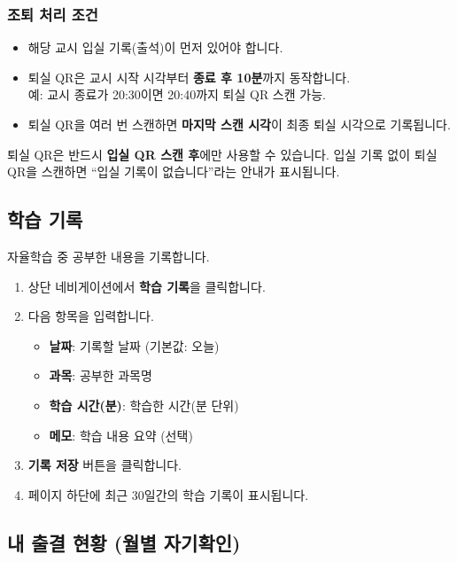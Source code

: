 \documentclass[a4paper,12pt]{article}
\newcommand{\menu}[1]{\textcolor{primary}{\textbf{#1}}}
\begin{document}
\subsubsection{조퇴 처리 조건}

\begin{itemize}[leftmargin=1.5em]
    \item 해당 교시 입실 기록(출석)이 먼저 있어야 합니다.
    \item 퇴실 QR은 교시 시작 시각부터 \textbf{종료 후 10분}까지 동작합니다.\\
          예: 교시 종료가 20:30이면 20:40까지 퇴실 QR 스캔 가능.
    \item 퇴실 QR을 여러 번 스캔하면 \textbf{마지막 스캔 시각}이 최종 퇴실 시각으로 기록됩니다.
\end{itemize}

\begin{warnbox}
  퇴실 QR은 반드시 \textbf{입실 QR 스캔 후}에만 사용할 수 있습니다.
  입실 기록 없이 퇴실 QR을 스캔하면 ``입실 기록이 없습니다''라는 안내가 표시됩니다.
\end{warnbox}

\subsection{학습 기록}

자율학습 중 공부한 내용을 기록합니다.

\begin{enumerate}[leftmargin=1.5em]
    \item 상단 네비게이션에서 \menu{학습 기록}을 클릭합니다.
    \item 다음 항목을 입력합니다.
    \begin{itemize}
        \item \textbf{날짜}: 기록할 날짜 (기본값: 오늘)
        \item \textbf{과목}: 공부한 과목명
        \item \textbf{학습 시간(분)}: 학습한 시간(분 단위)
        \item \textbf{메모}: 학습 내용 요약 (선택)
    \end{itemize}
    \item \menu{기록 저장} 버튼을 클릭합니다.
    \item 페이지 하단에 최근 30일간의 학습 기록이 표시됩니다.
\end{enumerate}

\subsection{내 출결 현황 (월별 자기확인)}
\end{document}
